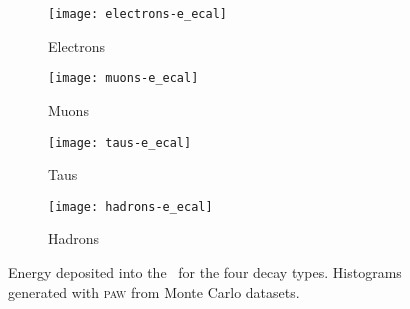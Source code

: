 \begin{figure}
    \centering
    \begin{subfigure}[c]{0.48\linewidth}
        \centering
        \texttt{[image: electrons-e\_ecal]}
        \caption{%
            Electrons
        }
        \label{fig:paw-e_ecal/electrons}
    \end{subfigure}
    \hfill
    \begin{subfigure}[c]{0.48\linewidth}
        \centering
        \texttt{[image: muons-e\_ecal]}
        \caption{%
            Muons
        }
        \label{fig:paw-e_ecal/muons}
    \end{subfigure}

    \vspace{2ex}

    \begin{subfigure}[c]{0.48\linewidth}
        \centering
        \texttt{[image: taus-e\_ecal]}
        \caption{%
            Taus
        }
        \label{fig:paw-e_ecal/taus}
    \end{subfigure}
    \hfill
    \begin{subfigure}[c]{0.48\linewidth}
        \centering
        \texttt{[image: hadrons-e\_ecal]}
        \caption{%
            Hadrons
        }
        \label{fig:paw-e_ecal/hadrons}
    \end{subfigure}
    \caption{%
        Energy deposited into the \ecal\ for the four decay types.
        Histograms generated with \textsc{paw} from Monte Carlo datasets.
    }
    \label{fig:paw-e_ecal}
\end{figure}
